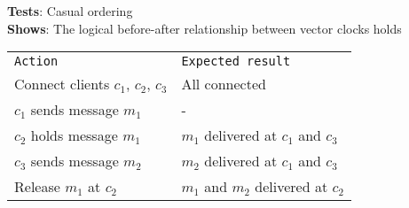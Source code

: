 



	


	\textbf{Tests}: Casual ordering \\
	\textbf{Shows}: The logical before-after relationship between vector clocks holds \\

	\begin{tabular}{ll}
		\texttt{Action} & \texttt{Expected result} \\
		Connect clients $c_1$, $c_2$, $c_3$ & All connected\\
		$c_1$ sends message $m_1$ & -\\
		$c_2$ holds message $m_1$ & $m_1$ delivered at $c_1$ and $c_3$ \\
		$c_3$ sends message $m_2$ & $m_2$ delivered at $c_1$ and $c_3$ \\
		Release $m_1$ at $c_2$ & $m_1$ and $m_2$ delivered at $c_2$ \\
	\end{tabular}


